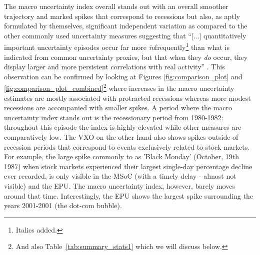 \documentclass[a4paper,11pt,listof=nochaptergap,oneside,pointednumbers,bibtotoc,bigheadings,liststotoc]{scrbook}
\theoremstyle{mysatz}
\theoremstyle{mydefinition}
\theoremstyle{mybemerkung}
\begin{document}
\endgroup
The macro uncertainty index overall stands out with an overall smoother trajectory and marked spikes that correspond to recessions but also, as aptly formulated by \citet{juradoetal:15} themselves, significant independent variation as compared to the other commonly used uncertainty measures suggesting that ``[...] quantitatively important uncertainty episodes occur far more \textit{in}frequently\footnote{Italics added.} than what is indicated from common uncertainty proxies, but that when they \textit{do} occur, they display larger and more persistent correlations with real activity'' \citep[p. 1181]{juradoetal:15}. This observation can be confirmed by looking at Figures \ref{fig:comparison_plot} and \ref{fig:comparison_plot_combined}\footnote{And also Table~\ref{tab:summary_stats1} which we will discuss below.} where increases in the macro uncertainty estimates are mostly associated with protracted recessions whereas more modest recessions are accompanied with smaller spikes. A period where the macro uncertainty index stands out is the recessionary period from 1980-1982: throughout this episode the index is highly elevated while other measures are comparatively low. The VXO on the other hand also shows spikes outside of recession periods that correspond to events exclusively related to stock-markets. For example, the large spike commonly to as 'Black Monday' (October, 19th 1987) when stock markets experienced their largest single-day percentage decline ever recorded, is only visible in the MSoC (with a timely delay - almost not visible) and the EPU. The macro uncertainty index, however, barely moves around that time. Interestingly, the EPU shows the largest spike surrounding the years 2001-2001 (the dot-com bubble). 

\begin{table}[t]
\centering
\caption[Correlation matrix of uncertainty measures.]{Correlation matrix of uncertainty measures. [check correlation between EPU and Macro! \citet{bakeretal:15}] report a value of 0.42 while we get 0.15!}
\label{tab:correlations}
\end{table}
\end{document}
